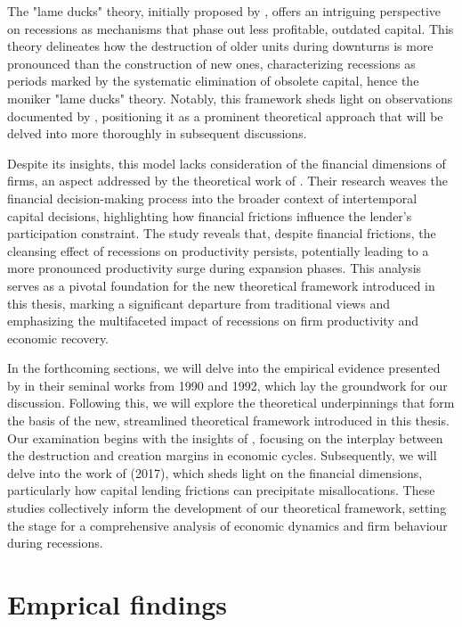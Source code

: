 \documentclass[12pt]{article}
\begin{document}
The "lame ducks" theory, initially proposed by \cite{CabHarm94}, offers an intriguing perspective on
recessions as mechanisms that phase out less profitable, outdated capital. This theory delineates how the destruction of
older units during downturns is more pronounced than the construction of new ones, characterizing recessions as periods
marked by the systematic elimination of obsolete capital, hence the moniker "lame ducks" theory. Notably, this framework
sheds light on observations documented by \cite{DavHalt92}, positioning it as a prominent theoretical
approach that will be delved into more thoroughly in subsequent discussions. 

Despite its insights, this model lacks consideration of the financial dimensions of firms, an aspect addressed by the
theoretical work of \cite{OsePap17}. Their research weaves the financial decision-making process into the
broader context of intertemporal capital decisions, highlighting how financial frictions influence the lender's
participation constraint. The study reveals that, despite financial frictions, the cleansing effect of recessions on
productivity persists, potentially leading to a more pronounced productivity surge during expansion phases. This
analysis serves as a pivotal foundation for the new theoretical framework introduced in this thesis, marking a
significant departure from traditional views and emphasizing the multifaceted impact of recessions on firm productivity
and economic recovery. 

In the forthcoming sections, we will delve into the empirical evidence presented by \cite{DavHalt92} in their
seminal works from 1990 and 1992, which lay the groundwork for our discussion. Following this, we will explore the
theoretical underpinnings that form the basis of the new, streamlined theoretical framework introduced in this thesis.
Our examination begins with the insights of \cite{CabHarm94}, focusing on the interplay between the
destruction and creation margins in economic cycles. Subsequently, we will delve into the work of \cite{OsePap17}
(2017), which sheds light on the financial dimensions, particularly how capital lending frictions can precipitate
misallocations. These studies collectively inform the development of our theoretical framework, setting the stage for a
comprehensive analysis of economic dynamics and firm behaviour during recessions. 

\section{Emprical findings}
\end{document}
